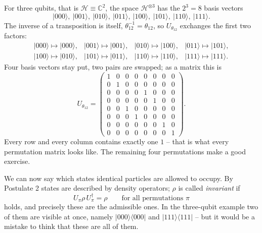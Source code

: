 \begin{example}
  For three qubits, that is $\mathcal{H}\equiv \mathbb{C}^2$, the space $\mathcal{H}^{\otimes 3}$ has the $2^3 = 8$ basis vectors
  \begin{equation}
    |000\rangle,\ |001\rangle,\ |010\rangle,\ |011\rangle,\ |100\rangle,\ |101\rangle,\ |110\rangle,\ |111\rangle.
  \end{equation}
  The inverse of a transposition is itself, $\theta_{12}^{-1} = \theta_{12}$, so $U_{\theta_{12}}$ exchanges the first two factors:
  \begin{equation}
    \begin{array}{llll}
      |000\rangle \mapsto |000\rangle, & |001\rangle \mapsto |001\rangle, & |010\rangle \mapsto |100\rangle, & |011\rangle \mapsto |101\rangle,\\
      |100\rangle \mapsto |010\rangle, & |101\rangle \mapsto |011\rangle, & |110\rangle \mapsto |110\rangle, & |111\rangle \mapsto |111\rangle.
    \end{array}
  \end{equation}
  Four basis vectors stay put, two pairs are swapped; as a matrix this is
  \begin{equation}
    U_{\theta_{12}} = \begin{pmatrix}
      1&0&0&0&0&0&0&0\\
      0&1&0&0&0&0&0&0\\
      0&0&0&0&1&0&0&0\\
      0&0&0&0&0&1&0&0\\
      0&0&1&0&0&0&0&0\\
      0&0&0&1&0&0&0&0\\
      0&0&0&0&0&0&1&0\\
      0&0&0&0&0&0&0&1
    \end{pmatrix}.
  \end{equation}
  Every row and every column contains exactly one $1$ -- that is what every permutation matrix looks like. The remaining four permutations make a good exercise.
\end{example}

We can now say which states identical particles are allowed to occupy. By Postulate 2 states are described by density operators; $\rho$ is called \emph{invariant} if
\begin{equation}
  U_\pi \rho\, U_\pi^\dagger = \rho \qquad \text{for all permutations $\pi$}
\end{equation}
holds, and precisely these are the admissible ones. In the three-qubit example two of them are visible at once, namely $|000\rangle\langle 000|$ and $|111\rangle\langle 111|$ -- but it would be a mistake to think that these are all of them.

